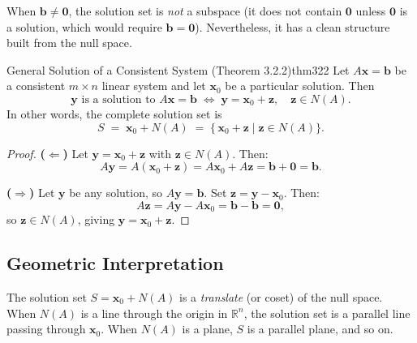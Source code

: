 \documentclass[12pt,a4paper]{article}
\newcommand{\R}{\mathbb{R}}
\newcommand{\vv}[1]{\mathbf{#1}}
\newcommand{\vzero}{\mathbf{0}}
\begin{document}
When $\vv{b} \neq \vzero$, the solution set is \emph{not} a subspace (it does not
contain $\vzero$ unless $\vzero$ is a solution, which would require $\vv{b}=\vzero$).
Nevertheless, it has a clean structure built from the null space.

\begin{theorem}{General Solution of a Consistent System (Theorem 3.2.2)}{thm322}
  Let $A\vv{x} = \vv{b}$ be a consistent $m\times n$ linear system and let
  $\vv{x}_0$ be a particular solution.  Then
  \[
    \boxed{
      \vv{y} \text{ is a solution to } A\vv{x}=\vv{b}
      \;\iff\;
      \vv{y} = \vv{x}_0 + \vv{z}, \quad \vv{z} \in N(A).
    }
  \]
  In other words, the complete solution set is
  \[
    S \;=\; \vv{x}_0 + N(A)
      \;=\; \bigl\{\, \vv{x}_0 + \vv{z} \;\big|\; \vv{z} \in N(A) \bigr\}.
  \]
\end{theorem}

\begin{proof}
\textbf{($\Leftarrow$)}\quad
Let $\vv{y} = \vv{x}_0 + \vv{z}$ with $\vv{z} \in N(A)$.  Then:
\[
  A\vv{y} = A(\vv{x}_0 + \vv{z}) = A\vv{x}_0 + A\vv{z} = \vv{b} + \vzero = \vv{b}.
\]

\textbf{($\Rightarrow$)}\quad
Let $\vv{y}$ be any solution, so $A\vv{y} = \vv{b}$.  Set $\vv{z} = \vv{y} - \vv{x}_0$.
Then:
\[
  A\vv{z} = A\vv{y} - A\vv{x}_0 = \vv{b} - \vv{b} = \vzero,
\]
so $\vv{z} \in N(A)$, giving $\vv{y} = \vv{x}_0 + \vv{z}$.
\end{proof}

\subsection{Geometric Interpretation}

\noindent
The solution set $S = \vv{x}_0 + N(A)$ is a \emph{translate} (or coset) of the
null space.  When $N(A)$ is a line through the origin in $\R^n$, the solution set
is a parallel line passing through $\vv{x}_0$.  When $N(A)$ is a plane, $S$ is a
parallel plane, and so on.
\end{document}
